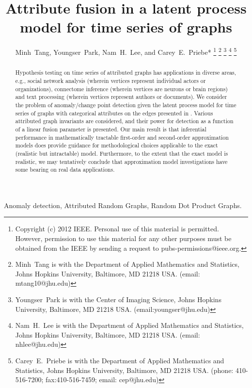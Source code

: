\documentclass[10pt,draftclsnofoot,onecolumn]{IEEEtran}
\theoremstyle{definition}
\begin{document}
\title{Attribute fusion in a latent process model for time series of
  graphs}
\author{Minh~Tang, Youngser~Park, Nam~H.~Lee, and Carey~E.~Priebe*%
  \thanks{Copyright (c) 2012 IEEE. Personal use of this material is permitted. However, permission to use this material for any other purposes must be obtained from the IEEE by sending a request to pubs-permissions@ieee.org.}
\thanks{Minh~Tang is with the Department of Applied Mathematics and
  Statistics, Johns Hopkins University, Baltimore, MD 21218
  USA. (email: mtang10@jhu.edu)}%
\thanks{Youngser~Park is with the Center of Imaging Science, Johns
  Hopkins University, Baltimore, MD 21218
  USA. (email:youngser@jhu.edu)}%
\thanks{Nam~H.~Lee is with the Department of Applied Mathematics and
  Statistics, Johns Hopkins University, Baltimore, MD 21218
  USA. (email: nhlee@jhu.edu)}%
\thanks{Carey~E.~Priebe is with the Department of Applied Mathematics and
  Statistics, Johns Hopkins University, Baltimore, MD 21218
  USA. (phone: 410-516-7200; fax:410-516-7459; email: cep@jhu.edu)}}%
\maketitle
\begin{abstract}
  Hypothesis testing on time series of attributed graphs has
  applications in diverse areas, e.g., social network analysis
  (wherein vertices represent individual actors or organizations),
  connectome inference (wherein vertices are neurons or brain regions)
  and text processing (wherein vertices represent authors or
  documents).  We consider the problem of anomaly/change point
  detection given the latent process model for time series of graphs
  with categorical attributes on the edges presented in \cite{lee11}.
  Various attributed graph invariants are considered, and their power
  for detection as a function of a linear fusion parameter is
  presented.  Our main result is that inferential performance in
  mathematically tractable first-order and second-order approximation
  models does provide guidance for methodological choices applicable
  to the exact (realistic but intractable) model. Furthermore, to the
  extent that the exact model is realistic, we may tentatively
  conclude that approximation model investigations have some bearing
  on real data applications.
\end{abstract}
 \begin{IEEEkeywords}
   Anomaly detection, Attributed Random Graphs, Random Dot
   Product Graphs.
 \end{IEEEkeywords}
\end{document}
